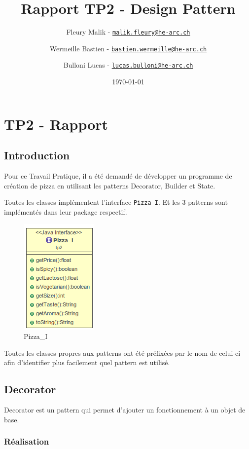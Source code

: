 \documentclass[french,]{article}
\title{Rapport TP2 - Design Pattern}
\author{Fleury Malik -
\href{mailto:malik.fleury@he-arc.ch}{\nolinkurl{malik.fleury@he-arc.ch}} \and Wermeille Bastien -
\href{mailto:bastien.wermeille@he-arc.ch}{\nolinkurl{bastien.wermeille@he-arc.ch}} \and Bulloni Lucas -
\href{mailto:lucas.bulloni@he-arc.ch}{\nolinkurl{lucas.bulloni@he-arc.ch}}}
\date{\today}
\begin{document}
\maketitle

{
\setcounter{tocdepth}{5}
\tableofcontents
}
\section{TP2 - Rapport}\label{tp2---rapport}

\subsection{Introduction}\label{introduction}

Pour ce Travail Pratique, il a été demandé de développer un programme de
création de pizza en utilisant les patterns Decorator, Builder et State.

Toutes les classes implémentent l'interface \texttt{Pizza\_I}. Et les 3
patterns sont implémentés dans leur package respectif.

\begin{figure}[htbp]
\centering
\includegraphics{pizza_i.png}
\caption{Pizza\_I}
\end{figure}

Toutes les classes propres aux patterns ont été préfixées par le nom de
celui-ci afin d'identifier plus facilement quel pattern est utilisé.

\subsection{Decorator}\label{decorator}

Decorator est un pattern qui permet d'ajouter un fonctionnement à un
objet de base.

\subsubsection{Réalisation}\label{ruxe9alisation}
\end{document}
